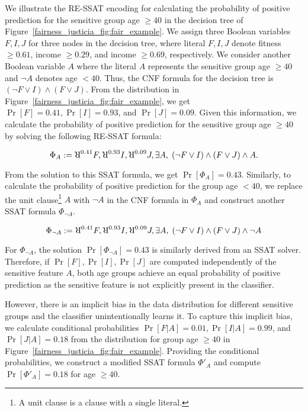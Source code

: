 \begin{example}
	\normalfont
	\label{fairness_justicia_example:re_ssat}
	We illustrate the RE-SSAT encoding for calculating the probability of positive prediction for the sensitive group age $ \ge 40 $ in the decision tree of Figure~\ref{fairness_justicia_fig:fair_example}. We assign three Boolean variables $ F,I,J $ for three nodes in the decision tree, where literal $ F,I,J $ denote fitness $ \ge 0.61 $, income $ \ge 0.29 $, and income $ \ge 0.69 $, respectively. We consider another Boolean variable $A$  where the literal $ A $ represents the sensitive group age $ \ge 40 $ and $ \neg A $ denotes age $ < 40 $. Thus, the CNF formula  for the decision tree is $ (\neg F \vee I) \wedge (F \vee J) $. From the distribution in Figure~\ref{fairness_justicia_fig:fair_example}, we get $ \Pr[F] = 0.41, \Pr[I] = 0.93 $, and $ \Pr[J] = 0.09 $. Given this information, we calculate the probability of positive prediction for the sensitive group age $ \ge 40 $ by solving the following RE-SSAT formula:
	
	\begin{equation}
	\Phi_A := \R^{0.41}F, \R^{0.93}I, \R^{0.09}J, \exists A, \; (\neg F \vee I) \wedge (F \vee J) \wedge A.\notag
	\end{equation}
	
	From the solution to this SSAT formula, we get $ \Pr[\Phi_A] = 0.43 $. Similarly, to calculate the probability of positive prediction for the group age $ < 40 $, we replace the unit clause\footnote{A unit clause is a clause with a single literal.} $ A $ with $ \neg A $ in the CNF formula in $ \Phi_A $ and construct another SSAT formula $ \Phi_{\neg A} $. 
	
	\[ \Phi_{\neg A} := \R^{0.41}F, \R^{0.93}I, \R^{0.09}J, \exists A, \; (\neg F \vee I) \wedge (F \vee J) \wedge \neg A \]
	
	For $ \Phi_{\neg A} $, the solution $ \Pr[\Phi_{\neg A}] = 0.43 $ is similarly derived from an SSAT solver. 
	Therefore, if $\Pr[F], \Pr[I], \Pr[J]$ are computed independently of the sensitive feature $A$, both age groups achieve an equal probability of positive prediction as the sensitive feature is not explicitly present in the classifier. 

	However, there is an implicit bias in the data distribution for different sensitive groups and the classifier unintentionally learns it. To capture this implicit bias, we calculate conditional probabilities  $ \Pr[F|A] = 0.01, \Pr[I|A] = 0.99 $, and $ \Pr[J|A] = 0.18 $ from the distribution for group age $ \ge 40 $ in Figure~\ref{fairness_justicia_fig:fair_example}. Providing the conditional probabilities, we construct a modified SSAT formula $\Phi'_A $ and compute $ \Pr[\Phi'_A] = 0.18 $ for age $ \ge 40 $. 
	

\end{example}
